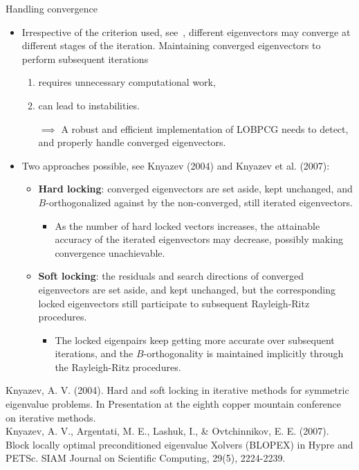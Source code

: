 \documentclass[t,usepdftitle=false]{beamer}
\begin{document}
\begin{frame}{Handling convergence}
\begin{itemize}
\item Irrespective of the criterion used, see~{}, different eigenvectors may converge at different stages of the iteration.
Maintaining converged eigenvectors to perform subsequent iterations
\begin{enumerate}
\item requires unnecessary computational work,
\item can lead to instabilities.
\item[$\implies$] A robust and efficient implementation of LOBPCG needs to detect, and properly handle converged eigenvectors.
\end{enumerate}	
\item Two approaches possible, see Knyazev (2004) and Knyazev et al. (2007):
\begin{itemize}
\item \textbf{Hard locking}: converged eigenvectors are set aside, kept unchanged, and $B$-orthogonalized against by the non-converged, still iterated eigenvectors.
\begin{itemize}
\item As the number of hard locked vectors increases, the attainable accuracy of the iterated eigenvectors may decrease, possibly making convergence unachievable.
\end{itemize}
\item \textbf{Soft locking}: the residuals and search directions of converged eigenvectors are set aside, and kept unchanged, but the corresponding locked eigenvectors still participate to subsequent Rayleigh-Ritz procedures.
\begin{itemize}
\item The locked eigenpairs keep getting more accurate over subsequent iterations, and the $B$-orthogonality is maintained implicitly through the Rayleigh-Ritz procedures.
\end{itemize}
\end{itemize}
\end{itemize}		
\medskip
\tiny{Knyazev, A. V. (2004). Hard and soft locking in iterative methods for symmetric eigenvalue problems. In Presentation at the eighth copper mountain conference on iterative methods.}\tinyskip\\
\tiny{Knyazev, A. V., Argentati, M. E., Lashuk, I., \& Ovtchinnikov, E. E. (2007). Block locally optimal preconditioned eigenvalue Xolvers (BLOPEX) in Hypre and PETSc. SIAM Journal on Scientific Computing, 29(5), 2224-2239.}
\end{frame}
\end{document}

